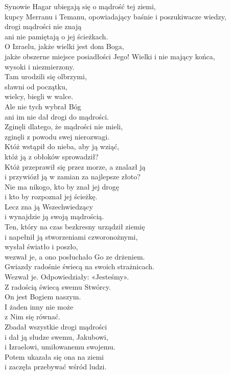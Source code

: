 \documentclass[10pt,a5paper]{book}
\begin{document}
Synowie Hagar ubiegają się o mądrość tej ziemi,\\
kupcy Merranu i Temanu, opowiadający baśnie i poszukiwacze wiedzy, \\
drogi mądrości nie znają \\
ani nie pamiętają o jej ścieżkach. \\
O Izraelu, jakże wielki jest dom Boga, \\
jakże obszerne miejsce posiadłości Jego!  Wielki i nie mający końca, \\
wysoki i niezmierzony. \\
Tam urodzili się olbrzymi, \\
sławni od początku, \\
wielcy, biegli w walce. \\
Ale nie tych wybrał Bóg \\
ani im nie dał drogi do mądrości. \\
Zginęli dlatego, że mądrości nie mieli, \\
zginęli z powodu swej nierozwagi. \\
Któż wstąpił do nieba, aby ją wziąć, \\
któż ją z obłoków sprowadził? \\
Któż przeprawił się przez morze, a znalazł ją \\
i przywiózł ją w zamian za najlepsze złoto? \\
Nie ma nikogo, kto by znał jej drogę \\
i kto by rozpoznał jej ścieżkę. \\
Lecz zna ją Wszechwiedzący \\
i wynajdzie ją swoją mądrością. \\
Ten, który na czas bezkresny urządził ziemię \\
i napełnił ją stworzeniami czworonożnymi, \\
wysłał światło i poszło, \\
wezwał je, a ono posłuchało Go ze drżeniem. \\
Gwiazdy radośnie świecą na swoich strażnicach.\\
Wezwał je. Odpowiedziały: «Jesteśmy». \\
Z radością świecą swemu Stwórcy. \\
On jest Bogiem naszym. \\
I żaden inny nie może \\
z Nim się równać. \\
Zbadał wszystkie drogi mądrości \\
i dał ją słudze swemu, Jakubowi, \\
i Izraelowi, umiłowanemu swojemu. \\
Potem ukazała się ona na ziemi \\
i zaczęła przebywać wśród ludzi.
\end{document}
